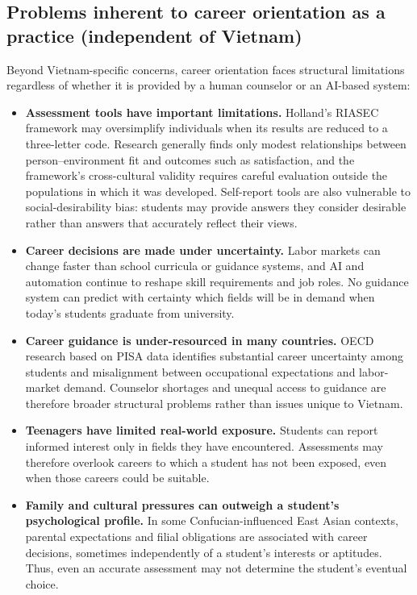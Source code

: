 \documentclass[a4paper]{article}
\begin{document}
\subsection{Problems inherent to career orientation as a practice (independent of Vietnam)}

Beyond Vietnam-specific concerns, career orientation faces structural limitations regardless of whether it is provided by a human counselor or an AI-based system:

\begin{itemize}
    \item \textbf{Assessment tools have important limitations.} Holland's RIASEC framework may oversimplify individuals when its results are reduced to a three-letter code. Research generally finds only modest relationships between person--environment fit and outcomes such as satisfaction, and the framework's cross-cultural validity requires careful evaluation outside the populations in which it was developed. Self-report tools are also vulnerable to social-desirability bias: students may provide answers they consider desirable rather than answers that accurately reflect their views.
    \item \textbf{Career decisions are made under uncertainty.} Labor markets can change faster than school curricula or guidance systems, and AI and automation continue to reshape skill requirements and job roles. No guidance system can predict with certainty which fields will be in demand when today's students graduate from university.
    \item \textbf{Career guidance is under-resourced in many countries.} OECD research based on PISA data identifies substantial career uncertainty among students and misalignment between occupational expectations and labor-market demand. Counselor shortages and unequal access to guidance are therefore broader structural problems rather than issues unique to Vietnam.
    \item \textbf{Teenagers have limited real-world exposure.} Students can report informed interest only in fields they have encountered. Assessments may therefore overlook careers to which a student has not been exposed, even when those careers could be suitable.
    \item \textbf{Family and cultural pressures can outweigh a student's psychological profile.} In some Confucian-influenced East Asian contexts, parental expectations and filial obligations are associated with career decisions, sometimes independently of a student's interests or aptitudes. Thus, even an accurate assessment may not determine the student's eventual choice.

\end{itemize}
\end{document}
